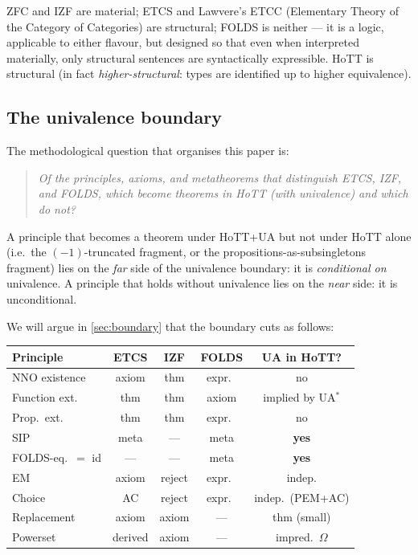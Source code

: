 \documentclass[12pt]{article}
\theoremstyle{definition}
\theoremstyle{remark}
\begin{document}
ZFC and IZF are material; ETCS and Lawvere's ETCC (Elementary Theory of the Category of
Categories) are structural; FOLDS is neither --- it is a logic, applicable to either
flavour, but designed so that even when interpreted materially, only structural sentences
are syntactically expressible. HoTT is structural (in fact \emph{higher-structural}: types
are identified up to higher equivalence).

\subsection{The univalence boundary}

The methodological question that organises this paper is:
\begin{quote}
\emph{Of the principles, axioms, and metatheorems that distinguish ETCS, IZF, and FOLDS,
which become theorems in HoTT (with univalence) and which do not?}
\end{quote}

A principle that becomes a theorem under HoTT+UA but not under HoTT alone (i.e.\ the
$(-1)$-truncated fragment, or the propositions-as-subsingletons fragment) lies on the
\emph{far} side of the univalence boundary: it is \emph{conditional on} univalence.
A principle that holds without univalence lies on the \emph{near} side: it is
unconditional.

We will argue in \cref{sec:boundary} that the boundary cuts as follows:

\begin{center}\small
\begin{tabular}{lcccc}
\toprule
\textbf{Principle} & ETCS & IZF & FOLDS & UA in HoTT? \\
\midrule
NNO existence & axiom & thm & expr.\ & no \\
Function ext. & thm & thm & axiom & implied by UA\(^{*}\) \\
Prop.\ ext. & thm & thm & expr.\ & no \\
SIP & meta & --- & meta & \textbf{yes} \\
FOLDS-eq.\ $=$ id & --- & --- & meta & \textbf{yes} \\
EM & axiom & reject & expr.\ & indep. \\
Choice & AC & reject & expr.\ & indep.\ (PEM+AC) \\
Replacement & axiom & axiom & --- & thm (small) \\
Powerset & derived & axiom & --- & impred.\ $\Omega$ \\
\bottomrule
\end{tabular}
\end{center}
\end{document}
